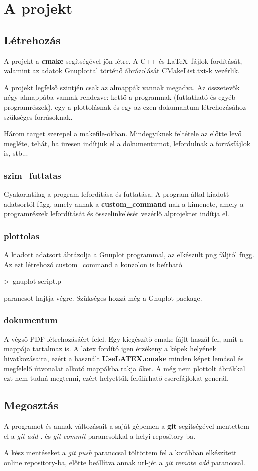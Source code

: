\documentclass[twoside]{article}
\begin{document}
	\pagebreak
	\section*{A projekt}
	\subsection*{Létrehozás}
		A projekt a \textbf{cmake} segítségével jön létre. A C++ és \LaTeX\ fájlok fordítását, valamint az adatok Gnuplottal történő ábrázolását CMakeList.txt-k vezérlik.\par 
		A projekt legfelső szintjén csak az almappák vannak megadva. Az összetevők négy almappába vannak rendezve: kettő a programnak (futtatható és egyéb programrészek), egy a plottolásnak és egy az ezen dokumantum létrehozásához szükséges forrásoknak.\par 
		Három target szerepel a makefile-okban. Mindegyiknek feltétele az előtte levő megléte, tehát, ha üresen indítjuk el a dokumentumot, lefordulnak a forrásfájlok is, stb...\par 
		\subsubsection*{szim\_futtatas}
		Gyakorlatilag a program lefordítása és futtatása. A program által kiadott adatsortól függ, amely annak a \textbf{custom\_command}-nak a kimenete, amely a programrészek lefordítását és összelinkelését vezérlő alprojektet indítja el.\par 
		\subsubsection*{plottolas}
		A kiadott adatsort ábrázolja a Gnuplot programmal, az elkészült png fáljtól függ. Az ezt létrehozó custom\_command a konzolon is beírható \par
		{ \centering \textgreater\ gnuplot script.p \par }
		parancsot hajtja végre. Szükséges hozzá még a Gnuplot package.
		\subsubsection*{dokumentum}
		A végső PDF létrehozásáért felel. Egy kiegészítő cmake fájlt haszál fel, amit a mappája tartalmaz is. A latex fordító igen érzékeny a képek helyének hivatkozásaira, ezért a használt \textbf{UseLATEX.cmake} minden képet lemásol és megfelelő útvonalat alkotó mappákba rakja őket. A még nem plottolt ábrákkal ezt nem tudná megtenni, ezért helyettük felülírhatő cserefájlokat generál.\par 
	\subsection*{Megosztás}
		A programot és annak változásait a saját gépemen a \textbf{git} segítségével mentettem el a \textit{git add .} és \textit{git commit} parancsokkal a helyi repository-ba. \par
		A kész mentéseket a \textit{git push} paranccsal töltöttem fel a korábban elkészített online repository-ba, előtte beállítva annak url-jét a \textit{git remote add} paranccsal.
\end{document}
